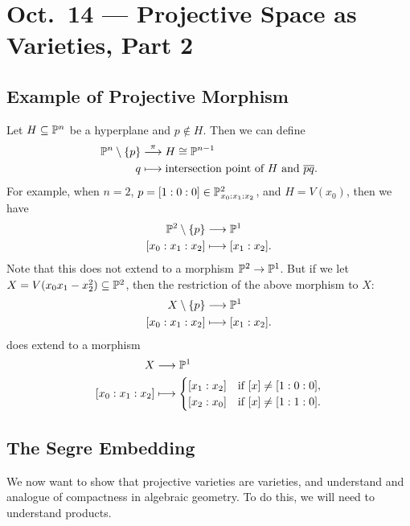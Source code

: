 \chapter{Oct.~14 --- Projective Space as Varieties, Part 2}

\section{Example of Projective Morphism}
\begin{example}
  Let $H \subseteq \mathbb{P}^n$ be a hyperplane
  and $p \notin H$. Then we can define
  \begin{align*}
    \mathbb{P}^n \setminus \{p\}
    &\overset{\pi}{\longrightarrow} H \cong \mathbb{P}^{n - 1} \\
    q &\longmapsto
    \text{intersection point of $H$ and $\overline{pq}$}.
  \end{align*}
  For example, when $n = 2$,
  $p = [1 : 0 : 0] \in \mathbb{P}^2_{x_0 : x_1 : x_2}$,
  and $H = V(x_0)$, then we have
  \begin{align*}
    \mathbb{P}^2 \setminus \{p\}
    &\longrightarrow \mathbb{P}^{1} \\
    [x_0 : x_1 : x_2]
    &\longmapsto [x_1 : x_2].
  \end{align*}
  Note that this does not extend to a
  morphism $\mathbb{P}^2 \to \mathbb{P}^1$. But if
  we let $X = V(x_0 x_1 - x_2^2) \subseteq \mathbb{P}^2$, then
  the restriction of the above morphism
  to $X$:
  \begin{align*}
    X \setminus \{p\}
    &\longrightarrow \mathbb{P}^{1} \\
    [x_0 : x_1 : x_2]
    &\longmapsto [x_1 : x_2].
  \end{align*}
  does extend to a morphism
  \begin{align*}
    X
    &\longrightarrow \mathbb{P}^{1} \\
    [x_0 : x_1 : x_2]
    &\longmapsto
    \begin{cases}
      [x_1 : x_2] & \text{if } [x] \ne [1 : 0 : 0], \\
      [x_2 : x_0] & \text{if } [x] \ne [1 : 1 : 0].
    \end{cases}
  \end{align*}
\end{example}

\section{The Segre Embedding}

\begin{remark}
  We now want to show that
  projective varieties are varieties, and
  understand and analogue of compactness
  in algebraic geometry.
  To do this, we will need to understand
  products.
\end{remark}

